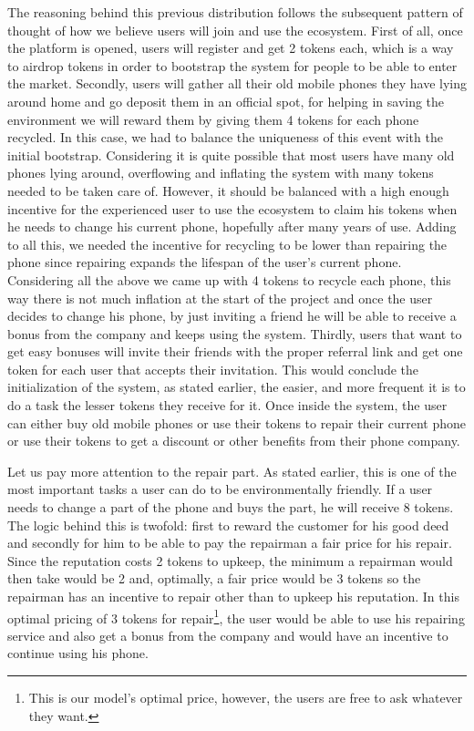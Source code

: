 \documentclass[11pt]{scrartcl}
\begin{document}
The reasoning behind this previous distribution follows the subsequent pattern of thought of how we believe users will join and use the ecosystem. First of all, once the platform is opened, users will register and get 2 tokens each, which is a way to airdrop tokens in order to bootstrap the system for people to be able to enter the market. Secondly, users will gather all their old mobile phones they have lying around home and go deposit them in an official spot, for helping in saving the environment we will reward them by giving them 4 tokens for each phone recycled. In this case, we had to balance the uniqueness of this event with the initial bootstrap. Considering it is quite possible that most users have many old phones lying around, overflowing and inflating the system with many tokens needed to be taken care of. However, it should be balanced with a high enough incentive for the experienced user to use the ecosystem to claim his tokens when he needs to change his current phone, hopefully after many years of use. Adding to all this, we needed the incentive for recycling to be lower than repairing the phone since repairing expands the lifespan of the user's current phone. Considering all the above we came up with 4 tokens to recycle each phone, this way there is not much inflation at the start of the project and once the user decides to change his phone, by just inviting a friend he will be able to receive a bonus from the company and keeps using the system. Thirdly, users that want to get easy bonuses will invite their friends with the proper referral link and get one token for each user that accepts their invitation. This would conclude the initialization of the system, as stated earlier, the easier, and more frequent it is to do a task the lesser tokens they receive for it. Once inside the system, the user can either buy old mobile phones or use their tokens to repair their current phone or use their tokens to get a discount or other benefits from their phone company.

Let us pay more attention to the repair part. As stated earlier, this is one of the most important tasks a user can do to be environmentally friendly. If a user needs to change a part of the phone and buys the part, he will receive 8 tokens. The logic behind this is twofold: first to reward the customer for his good deed and secondly for him to be able to pay the repairman a fair price for his repair. Since the reputation costs 2 tokens to upkeep, the minimum a repairman would then take would be 2 and, optimally, a fair price would be 3 tokens so the repairman has an incentive to repair other than to upkeep his reputation. In this optimal pricing of 3 tokens for repair\footnote{This is our model's optimal price, however, the users are free to ask whatever they want.}, the user would be able to use his repairing service and also get a bonus from the company and would have an incentive to continue using his phone.
\end{document}
